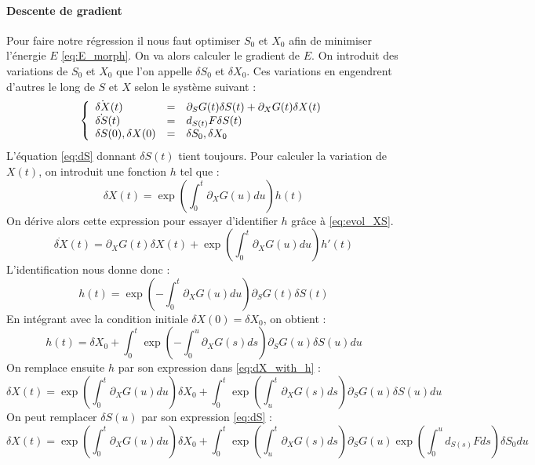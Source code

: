 \paragraph{Descente de gradient}
Pour faire notre régression il nous faut optimiser $S_0$ et $X_0$ afin de minimiser l'énergie $E$ \eqref{eq:E_morph}. On va alors calculer le gradient de $E$. On introduit des variations de $S_0$ et $X_0$ que l'on appelle $\delta S_0$ et $\delta X_0$. Ces variations en engendrent d'autres le long de $S$ et $X$ selon le système suivant :
\begin{equation}
	\label{eq:evol_XS}
	\syst{lll}{
		\dot{\delta X}(t) & = & \partial_S G(t) \delta S(t) + \partial_X G(t) \delta X(t) \\
		\dot{\delta S}(t) & = & d_{S(t)} F \delta S(t) \\
		\delta S(0), \delta X(0) & = & \delta S_0, \delta X_0
	}
\end{equation}
L'équation \eqref{eq:dS} donnant $\delta S(t)$ tient toujours. Pour calculer la variation de $X(t)$, on introduit une fonction $h$ tel que :
\begin{equation}
	\label{eq:dX_with_h}
	\delta X(t) = \exp \left( \int_0^t \partial_X G(u) du \right) h(t)
\end{equation}
On dérive alors cette expression pour essayer d'identifier $h$ grâce à \eqref{eq:evol_XS}.
\begin{equation}
	\dot{\delta X}(t) = \partial_X G(t) \delta X(t) + \exp \left( \int_0^t \partial_X G(u) du \right) h'(t)
\end{equation}
L'identification nous donne donc :
\begin{equation}
	h(t) = \exp \left( - \int_0^t \partial_X G(u) du \right) \partial_S G(t) \delta S(t)
\end{equation}
En intégrant avec la condition initiale $\delta X(0) = \delta X_0$, on obtient :
\begin{equation}
	h(t) = \delta X_0 + \int_0^t \exp \left( - \int_0^u \partial_X G(s) ds \right) \partial_S G(u) \delta S(u) du
\end{equation}
On remplace ensuite $h$ par son expression dans \eqref{eq:dX_with_h} :
\begin{equation}
	\delta X(t) = \exp \left( \int_0^t \partial_X G(u) du \right) \delta X_0 + \int_0^t \exp \left( \int_u^t \partial_X G(s) ds \right) \partial_S G(u) \delta S(u) du
\end{equation}
On peut remplacer $\delta S(u)$ par son expression \eqref{eq:dS} :
\begin{equation}
	\delta X(t) = \exp \left( \int_0^t \partial_X G(u) du \right) \delta X_0 + \int_0^t \exp \left( \int_u^t \partial_X G(s) ds \right) \partial_S G(u) \exp \left( \int_0^u d_{S(s)} F ds \right)\delta S_0 du
\end{equation}
